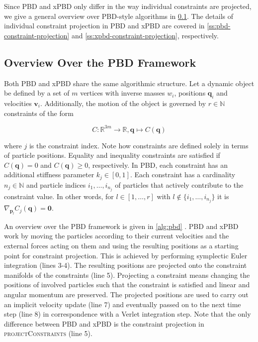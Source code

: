 Since PBD and xPBD only differ in the way individual constraints are projected, we give a general overview over PBD-style algorithms 
in \cref{ss:pbd-framework}. 
The details of individual constraint projection in PBD and xPBD are covered in \cref{ss:pbd-constraint-projection} and 
\cref{ss:xpbd-constraint-projection}, respectively.

\subsection{Overview Over the PBD Framework}\label{ss:pbd-framework}
Both PBD and xPBD share the same algorithmic structure. Let a dynamic object be defined by a set of $m$ 
vertices with inverse masses $w_i$, positions $\bm{q}_i$ and velocities $\bm{v}_i$. Additionally, the motion of the object is governed by 
$r \in \mathbb{N}$ constraints of the form 

\[
C \colon \mathbb{R}^{3m} \to \mathbb{R}, \bm{q} \mapsto C(\bm{q})
\]

\noindent where $j$ is the constraint index. Note how constraints are defined solely in terms of particle positions. Equality and inequality constraints 
are satisfied if $C(\bm{q}) = 0$ and $C(\bm{q}) \geq 0$, respectively. In PBD, each constraint has an additional stiffness parameter $k_j \in [0,1]$. 
Each constraint has a cardinality $n_j \in \mathbb{N}$ and particle indices $i_1, \ldots, i_{n_j}$ of particles that actively contribute to the 
constraint value. In other words, for $l \in [1, \ldots, r]$ with $l \notin \{i_1, \ldots, i_{n_j}\}$ it is $\nabla_{\bm{p}_l}C_j(\bm{q}) = \bm{0}$.

An overview over the PBD framework is given in \cref{alg:pbd} \cite{mueller2006}. PBD and xPBD work by moving the particles according to their current 
velocities and the external forces acting on them and using the resulting positions as a starting point for constraint projection. This is achieved by 
performing symplectic Euler integration (lines 3-4). The resulting positions 
are projected onto the constraint manifolds of the constraints (line 5). Projecting a constraint means changing the positions of involved particles 
such that the constraint is satisfied and linear and angular momentum are preserved. The projected positions are used to carry out an implicit 
velocity update (line 7) and eventually passed on to the next time step (line 8) in correspondence with a Verlet integration step. Note that the only
difference between PBD and xPBD is the constraint projection in \textsc{projectConstraints} (line 5).

